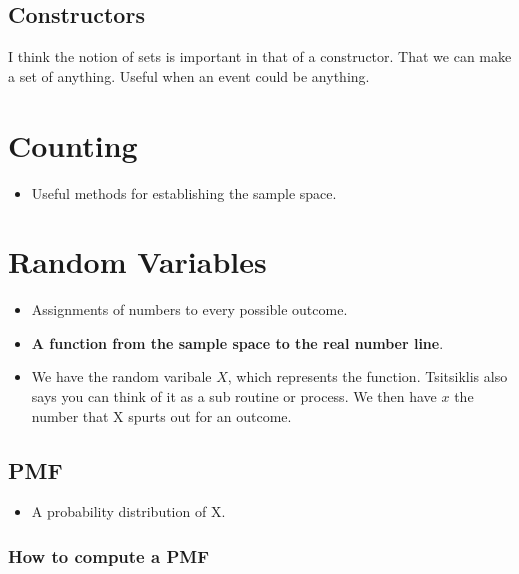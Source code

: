 \documentclass[11pt]{article}
\begin{document}
\hypertarget{constructors}{%
\subsection{Constructors}\label{constructors}}

I think the notion of sets is important in that of a constructor. That
we can make a set of anything. Useful when an event could be anything.

\hypertarget{counting}{%
\section{Counting}\label{counting}}

\begin{itemize}
\tightlist
\item
  Useful methods for establishing the sample space.
\end{itemize}

\hypertarget{random-variables}{%
\section{Random Variables}\label{random-variables}}

\begin{itemize}
\tightlist
\item
  Assignments of numbers to every possible outcome.
\item
  \textbf{A function from the sample space \Omega to the real number
  line}.
\item
  We have the random varibale \(X\), which represents the function.
  Tsitsiklis also says you can think of it as a sub routine or process.
  We then have \(x\) the number that X spurts out for an outcome.
\end{itemize}

\hypertarget{pmf}{%
\subsection{PMF}\label{pmf}}

\begin{itemize}
\tightlist
\item
  A probability distribution of X.
\end{itemize}

\hypertarget{how-to-compute-a-pmf}{%
\subsubsection{How to compute a PMF}\label{how-to-compute-a-pmf}}
\end{document}
